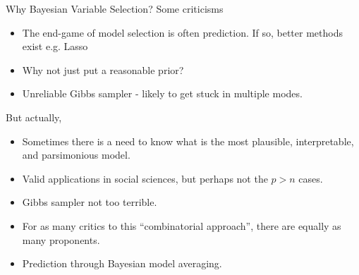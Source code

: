 \documentclass{beamer}\usepackage[]{graphicx}\usepackage[]{color}
\begin{document}
\begin{frame}{Why Bayesian Variable Selection?}
	Some criticisms
	\begin{itemize}
		\item The end-game of model selection is often prediction. If so, better methods exist e.g. Lasso
		\item Why not just put a reasonable prior?
		\item Unreliable Gibbs sampler - likely to get stuck in multiple modes.
	\end{itemize}

	\pause

	But actually,
	\begin{itemize}
		\item Sometimes there is a need to know what is the most plausible, interpretable, and parsimonious model.
		\item Valid applications in social sciences, but perhaps not the $p > n$ cases.
		\item Gibbs sampler not too terrible.
		\item For as many critics to this ``combinatorial approach'', there are equally as many proponents.
		\item Prediction through Bayesian model averaging.
	\end{itemize}
\end{frame}
\end{document}
